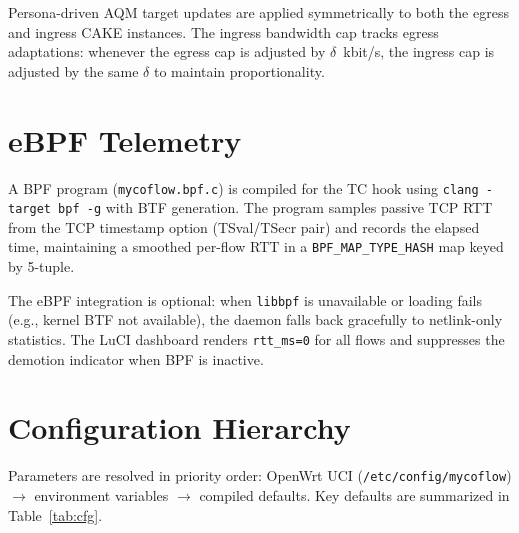 Persona-driven AQM target updates are applied symmetrically to both the egress and ingress CAKE instances. The ingress bandwidth cap tracks egress adaptations: whenever the egress cap is adjusted by $\delta$~kbit/s, the ingress cap is adjusted by the same $\delta$ to maintain proportionality.

\section{eBPF Telemetry}

A BPF program (\texttt{mycoflow.bpf.c}) is compiled for the TC hook using \texttt{clang -target bpf -g} with BTF generation. The program samples passive TCP RTT from the TCP timestamp option (TSval/TSecr pair) and records the elapsed time, maintaining a smoothed per-flow RTT in a \texttt{BPF\_MAP\_TYPE\_HASH} map keyed by 5-tuple.

The eBPF integration is optional: when \texttt{libbpf} is unavailable or loading fails (e.g., kernel BTF not available), the daemon falls back gracefully to netlink-only statistics. The LuCI dashboard renders \texttt{rtt\_ms=0} for all flows and suppresses the demotion indicator when BPF is inactive.

\section{Configuration Hierarchy}

Parameters are resolved in priority order: OpenWrt UCI (\texttt{/etc/config/mycoflow}) $\to$ environment variables $\to$ compiled defaults. Key defaults are summarized in Table~\ref{tab:cfg}.

